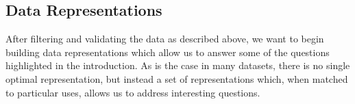 





\subsection{Data Representations}


After filtering and validating the data as described above, we want to begin building data representations which allow us to answer some of the questions highlighted in the introduction. As is the case in many datasets, there is no single optimal representation, but instead a set of representations which, when matched to particular uses, allows us to address interesting questions.

